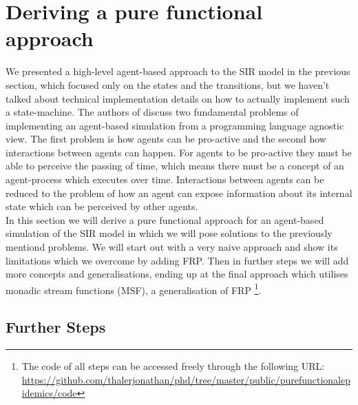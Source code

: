 \section{Deriving a pure functional approach}

We presented a high-level agent-based approach to the SIR model in the previous section, which focused only on the states and the transitions, but we haven't talked about technical implementation details on how to actually implement such a state-machine. The authors of \cite{thaler_art_2017} discuss two fundamental problems of implementing an agent-based simulation from a programming language agnostic view. The first problem is how agents can be pro-active and the second how interactions between agents can happen. For agents to be pro-active they must be able to perceive the passing of time, which means there must be a concept of an agent-process which executes over time. Interactions between agents can be reduced to the problem of how an agent can expose information about its internal state which can be perceived by other agents. \\
In this section we will derive a pure functional approach for an agent-based simulation of the SIR model in which we will pose solutions to the previously mentiond problems. We will start out with a very naive approach and show its limitations which we overcome by adding FRP. Then in further steps we will add more concepts and generalisations, ending up at the final approach which utilises monadic stream functions (MSF), a generalisation of FRP 
\footnote{The code of all steps can be accessed freely through the following URL: \url{https://github.com/thalerjonathan/phd/tree/master/public/purefunctionalepidemics/code}}.












\subsection{Further Steps}
